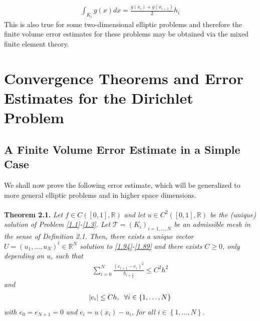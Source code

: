 \documentclass[a4paper]{article}
\numberwithin{equation}{section}
\begin{document}
\begin{align}
\int_{{K_i}} {g\left( x \right)dx}  = \frac{{g\left( {{x_i}} \right) + g\left( {{x_{i + 1}}} \right)}}{2}{h_i}
\end{align}
This is also true for some two-dimensional elliptic problems and therefore the finite volume error estimates for these problems may be obtained via the mixed finite element theory.
\section{Convergence Theorems and Error Estimates for the Dirichlet Problem}
\subsection{A Finite Volume Error Estimate in a Simple Case}
We shall now prove the following error estimate, which will be generalized to more general elliptic problems and in higher space dimensions.\\
\\
\textbf{Theorem 2.1.} \textit{Let $f \in C\left( {\left[ {0,1} \right],\mathbb{R}} \right)$ and let $u \in {C^2}\left( {\left[ {0,1} \right],\mathbb{R}} \right)$ be the (unique) solution of Problem \eqref{1.1}-\eqref{1.3}. Let $\mathcal{T} = {\left( {{K_i}} \right)_{i = 1, \ldots ,N}}$ be an admissible mesh in the sense of Definition 2.1. Then, there exists a unique vector $U = {\left( {{u_1}, \ldots ,{u_N}} \right)^t} \in {\mathbb{R}^N}$ solution to \eqref{1.94}-\eqref{1.89} and there exists $C\ge 0$, only depending on $u$, such that}
\begin{align}
\label{2.1}
\sum\limits_{i = 0}^N {\frac{{{{\left( {{e_{i + 1}} - {e_i}} \right)}^2}}}{{{h_{i + \frac{1}{2}}}}}}  \le {C^2}{h^2}
\end{align}
\textit{and}
\begin{align}
\label{2.2}
\left| {{e_i}} \right| \le Ch,\hspace{0.2cm}\forall i \in \left\{ {1, \ldots ,N} \right\}
\end{align}
\textit{with ${e_0} = {e_{N + 1}} = 0$ and ${e_i} = u\left( {{x_i}} \right) - {u_i}$, for all $i \in \left\{ {1, \ldots ,N} \right\}$.}\\
\end{document}
